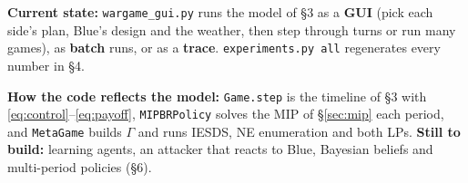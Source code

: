 
\textbf{Current state:} \texttt{wargame\_gui.py} runs the model of \S3 as a \textbf{GUI} (pick each side's plan,
Blue's design and the weather, then step through turns or run many games), as \textbf{batch} runs, or as a \textbf{trace}. \texttt{experiments.py all} regenerates
every number in \S4. 

\textbf{How the code reflects the model:} \texttt{Game.step} is the timeline of \S3 with
\eqref{eq:control}--\eqref{eq:payoff}, \texttt{MIPBRPolicy} solves the MIP of \S\ref{sec:mip} each period, and
\texttt{MetaGame} builds $\Gamma$ and runs IESDS, NE enumeration and both LPs. \textbf{Still to build:} learning agents, an attacker that reacts to Blue, Bayesian beliefs and multi-period
policies (\S6). 
